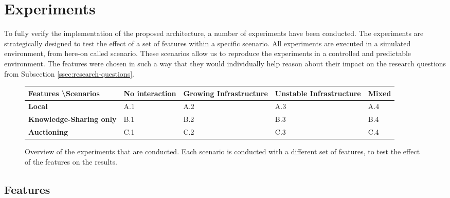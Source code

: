 \section{Experiments}
\label{sec:experiments}
To fully verify the implementation of the proposed architecture, a number of experiments have been conducted. The experiments are strategically designed to test the effect of a set of features within a specific scenario. All experiments are executed in a simulated environment, from here-on called scenario. These scenarios allow us to reproduce the experiments in a controlled and predictable environment. The features were chosen in such a way that they would individually help reason about their impact on the research questions from Subsection \ref{ssec:research-questions}.

\begin{figure}[H]
    \begin{adjustwidth}{-2cm}{}
        \centering
        \begin{tabular}{l|llll}
            \textbf{Features \textbackslash Scenarios} & \textbf{No interaction} & \textbf{Growing Infrastructure} & \textbf{Unstable Infrastructure} & \textbf{Mixed} \\ \hline
            \textbf{Local}                             & A.1            & A.2                    & A.3                     & A.4   \\
            \textbf{Knowledge-Sharing only}            & B.1            & B.2                    & B.3                     & B.4   \\
            \textbf{Auctioning}                        & C.1            & C.2                    & C.3                     & C.4     
        \end{tabular}
        \caption{\label{fig:experiments}Overview of the experiments that are conducted. Each scenario is conducted with a different set of features, to test the effect of the features on the results.}
    \end{adjustwidth}
\end{figure}

\subsection*{Features}


